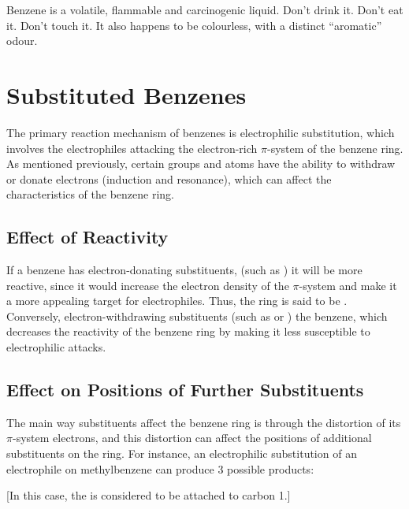 			Benzene is a volatile, flammable and carcinogenic liquid. Don't drink it. Don't eat it. Don't touch it. It also happens to be
			colourless, with a distinct \enquote{aromatic} odour.



	\section{Substituted Benzenes}

		The primary reaction mechanism of benzenes is electrophilic substitution, which involves the electrophiles attacking the
		electron-rich $\pi$-system of the benzene ring. As mentioned previously, certain groups and atoms have the ability to withdraw or
		donate electrons (induction and resonance), which can affect the characteristics of the benzene ring.


		\subsection{Effect of Reactivity}

			If a benzene has electron-donating substituents, (such as ) it will be more reactive, since it would increase
			the electron density of the $\pi$-system and make it a more appealing target for electrophiles. Thus, the ring is said to
			be . Conversely, electron-withdrawing substituents (such as  or ) 
			the benzene, which decreases the reactivity of the benzene ring by making it less susceptible to electrophilic attacks.


		\pagebreak
		\subsection{Effect on Positions of Further Substituents}

			The main way substituents affect the benzene ring is through the distortion of its $\pi$-system electrons, and this distortion
			can affect the positions of additional substituents on the ring. For instance, an electrophilic substitution of an
			electrophile  on methylbenzene can produce 3 possible products:

			[In this case, the  is considered to be attached to carbon 1.]

